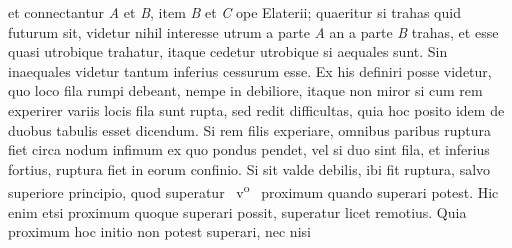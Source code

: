 et connectantur \textit{A} et \textit{B},
item \textit{B} et \textit{C} ope Elaterii;%
\protect{}
quaeritur si trahas quid futurum sit,
videtur nihil interesse
utrum a parte \textit{A} an a parte \textit{B} trahas,
et esse quasi utrobique trahatur,
itaque cedetur utrobique si aequales sunt.
Sin inaequales
videtur tantum inferius cessurum esse.
\pend
\pstart%
Ex his definiri posse videtur,
quo loco fila%
\protect{}\protect{}
rumpi debeant,%
nempe in debiliore,
itaque non miror
si cum rem experirer
variis locis fila sunt rupta,%
\protect{}\protect{}
sed redit difficultas,\protect{}
quia hoc posito idem
%
%
%
de duobus tabulis%
\protect{}\protect{}
esset dicendum.
Si rem filis\protect{} experiare,
omnibus paribus ruptura\protect{}
fiet circa nodum\protect{} infimum
ex quo pondus pendet,\protect{}
vel si duo sint fila,\protect{}
et inferius fortius,
ruptura\protect{} fiet in eorum confinio.
Si
%
%
sit valde debilis,
ibi fit ruptura,\protect{}
salvo
%
superiore principio,\protect{}
%
quod superatur
%
~v\textsuperscript{o}\rbrack\ %
%
proximum quando superari potest.
Hic enim etsi proximum
%
%
quoque superari possit,
superatur
%
%
licet remotius.
Quia proximum hoc initio non potest superari,
%
%
nec nisi
